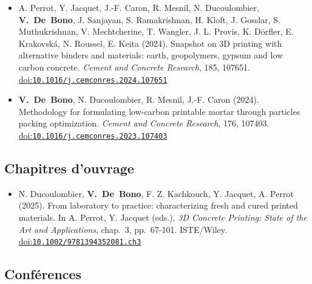 \documentclass[11pt,a4paper]{article}
\newcommand{\doi}[1]{\href{https://doi.org/#1}{doi:\nolinkurl{#1}}}
\newcommand{\me}{\textbf{V.~De~Bono}}
\newenvironment{publis}[1]%
  {\begin{itemize}[label={}, leftmargin=1.2em, labelwidth=0pt, labelsep=0pt,
     itemindent=-1.2em, itemsep=0.45em, topsep=0.3em]}%
  {\end{itemize}}
\begin{document}
\begin{publis}{A}
  \item A. Perrot, Y. Jacquet, J.-F. Caron, R. Mesnil, N. Ducoulombier, \me, J. Sanjayan, S. Ramakrishnan, H. Kloft, J. Gosslar, S. Muthukrishnan, V. Mechtcherine, T. Wangler, J. L. Provis, K. Dörfler, E. Krakovská, N. Roussel, E. Keita (2024).
  Snapshot on 3D printing with alternative binders and materials: earth, geopolymers, gypsum and low carbon concrete.
  \emph{Cement and Concrete Research}, 185, 107651.
  \doi{10.1016/j.cemconres.2024.107651}

  \item \me, N. Ducoulombier, R. Mesnil, J.-F. Caron (2024).
  Methodology for formulating low-carbon printable mortar through particles packing optimization.
  \emph{Cement and Concrete Research}, 176, 107403.
  \doi{10.1016/j.cemconres.2023.107403}
\end{publis}

\subsection*{Chapitres d'ouvrage}

\begin{publis}{O}
  \item N. Ducoulombier, \me, F. Z. Kachkouch, Y. Jacquet, A. Perrot (2025).
  From laboratory to practice: characterizing fresh and cured printed materials.
  In A. Perrot, Y. Jacquet (eds.), \emph{3D Concrete Printing: State of the Art and Applications}, chap.~3, pp.~67-101. ISTE/Wiley.
  \doi{10.1002/9781394352081.ch3}

\end{publis}

\subsection*{Conférences}
\end{document}

